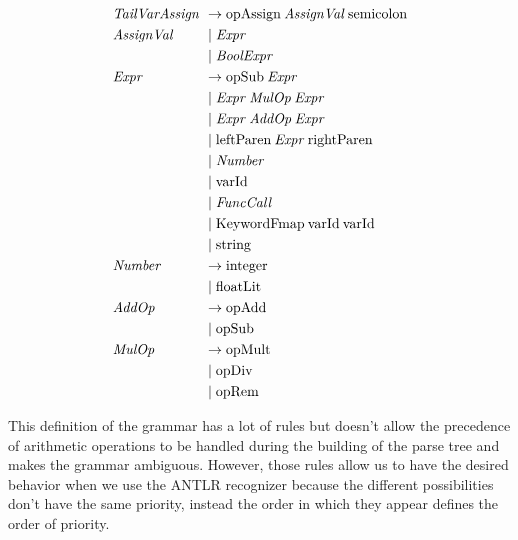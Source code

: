 \begin{align*}
    \omit $\mathit{TailVarAssign}$ \hfil & \rightarrow \text{opAssign} \: \mathit{AssignVal} \: \text{semicolon} \\
    \omit $\mathit{AssignVal}$ \hfil & \mid \mathit{Expr} \\
    & \mid \mathit{BoolExpr}\\
    \omit $\mathit{Expr}$ \hfil & \rightarrow \text{opSub} \: \mathit{Expr} \\
    & \mid \mathit{Expr} \: \mathit{MulOp} \: \mathit{Expr} \\
    & \mid \mathit{Expr} \: \mathit{AddOp} \: \mathit{Expr} \\
    & \mid \text{leftParen}\: \mathit{Expr} \: \text{rightParen} \\
    & \mid \mathit{Number} \\
    & \mid \text{varId} \\
    & \mid \mathit{FuncCall} \\
    & \mid \text{KeywordFmap} \: \text{varId} \: \text{varId} \\
    & \mid \text{string} \\
    \omit $\mathit{Number}$ \hfil & \rightarrow \text{integer} \\
    & \mid \text{floatLit} \\
    \omit $\mathit{AddOp}$ \hfil & \rightarrow \text{opAdd} \\
    & \mid \text{opSub} \\
    \omit $\mathit{MulOp}$ \hfil & \rightarrow \text{opMult} \\
    & \mid \text{opDiv} \\
    & \mid \text{opRem}
\end{align*}

This definition of the grammar has a lot of rules but doesn't allow the precedence of arithmetic operations to be handled during the building of the parse tree and makes the grammar ambiguous.
However, those rules allow us to have the desired behavior when we use the ANTLR recognizer because the different possibilities don't have the same priority, instead the order in which they appear defines the order of priority.

